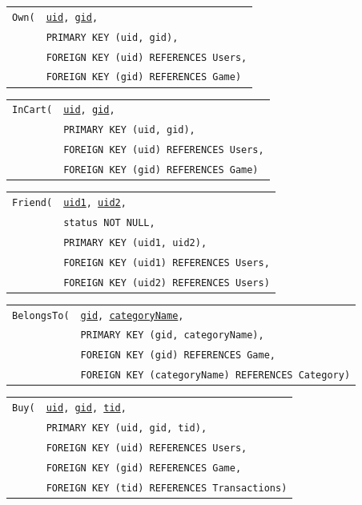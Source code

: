 \documentclass[12pt, oneside]{article}
\begin{document}
\begin{tabular}{l@{}l}
    \texttt{Own(} & \texttt{\underline{uid}, \underline{gid},}\\
                   & \texttt{PRIMARY KEY (uid, gid),}\\
                   & \texttt{FOREIGN KEY (uid) REFERENCES Users,}\\
                   & \texttt{FOREIGN KEY (gid) REFERENCES Game)}
\end{tabular}

\begin{tabular}{l@{}l}
    \texttt{InCart(} & \texttt{\underline{uid}, \underline{gid},}\\
                      & \texttt{PRIMARY KEY (uid, gid),}\\
                      & \texttt{FOREIGN KEY (uid) REFERENCES Users,}\\
                      & \texttt{FOREIGN KEY (gid) REFERENCES Game)}
\end{tabular}

\begin{tabular}{l@{}l}
    \texttt{Friend(} & \texttt{\underline{uid1}, \underline{uid2},}\\
                      & \texttt{status NOT NULL,}\\
                      & \texttt{PRIMARY KEY (uid1, uid2),}\\
                      & \texttt{FOREIGN KEY (uid1) REFERENCES Users,}\\
                      & \texttt{FOREIGN KEY (uid2) REFERENCES Users)}
\end{tabular}

\begin{tabular}{l@{}l}
    \texttt{BelongsTo(} & \texttt{\underline{gid}, \underline{categoryName},}\\
                          & \texttt{PRIMARY KEY (gid, categoryName),}\\
                          & \texttt{FOREIGN KEY (gid) REFERENCES Game,}\\
                          & \texttt{FOREIGN KEY (categoryName) REFERENCES Category)}
\end{tabular}

\begin{tabular}{l@{}l}
    \texttt{Buy(} & \texttt{\underline{uid}, \underline{gid}, \underline{tid},}\\
                   & \texttt{PRIMARY KEY (uid, gid, tid),}\\
                   & \texttt{FOREIGN KEY (uid) REFERENCES Users,}\\
                   & \texttt{FOREIGN KEY (gid) REFERENCES Game,}\\
                   & \texttt{FOREIGN KEY (tid) REFERENCES Transactions)}
\end{tabular}


\vspace{.25in}
\end{document}
